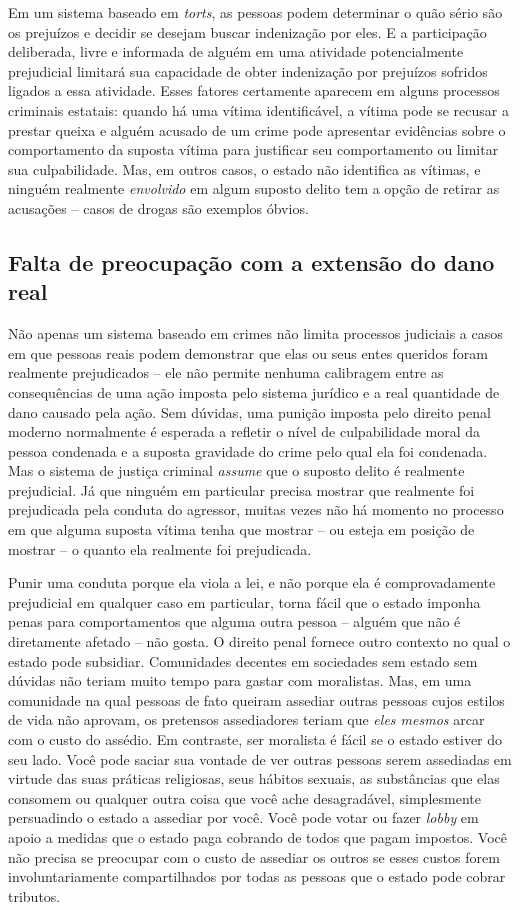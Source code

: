 Em um sistema baseado em \emph{torts}, as pessoas podem determinar o quão sério são os prejuízos e decidir se desejam buscar indenização por eles. E a participação deliberada, livre e informada de alguém em uma atividade potencialmente prejudicial limitará sua capacidade de obter indenização por prejuízos sofridos ligados a essa atividade. Esses fatores certamente aparecem em alguns processos criminais estatais: quando há uma vítima identificável, a vítima pode se recusar a prestar queixa e alguém acusado de um crime pode apresentar evidências sobre o comportamento da suposta vítima para justificar seu comportamento ou limitar sua culpabilidade. Mas, em outros casos, o estado não identifica as vítimas, e ninguém realmente \emph{envolvido} em algum suposto delito tem a opção de retirar as acusações -- casos de drogas são exemplos óbvios.

\subsection*{Falta de preocupação com a extensão do dano real}

Não apenas um sistema baseado em crimes não limita processos judiciais a casos em que pessoas reais podem demonstrar que elas ou seus entes queridos foram realmente prejudicados -- ele não permite nenhuma calibragem entre as consequências de uma ação imposta pelo sistema jurídico e a real quantidade de dano causado pela ação. Sem dúvidas, uma punição imposta pelo direito penal moderno normalmente é esperada a refletir o nível de culpabilidade moral da pessoa condenada e a suposta gravidade do crime pelo qual ela foi condenada. Mas o sistema de justiça criminal \emph{assume} que o suposto delito é realmente prejudicial. Já que ninguém em particular precisa mostrar que realmente foi prejudicada pela conduta do agressor, muitas vezes não há momento no processo em que alguma suposta vítima tenha que mostrar -- ou esteja em posição de mostrar -- o quanto ela realmente foi prejudicada. 

Punir uma conduta porque ela viola a lei, e não porque ela é comprovadamente prejudicial em qualquer caso em particular, torna fácil que o estado imponha penas para comportamentos que alguma outra pessoa -- alguém que não é diretamente afetado -- não gosta. O direito penal fornece outro contexto no qual o estado pode subsidiar. Comunidades decentes em sociedades sem estado sem dúvidas não teriam muito tempo para gastar com moralistas. Mas, em uma comunidade na qual pessoas de fato queiram assediar outras pessoas cujos estilos de vida não aprovam, os pretensos assediadores teriam que \emph{eles mesmos} arcar com o custo do assédio. Em contraste, ser moralista é fácil se o estado estiver do seu lado. Você pode saciar sua vontade de ver outras pessoas serem assediadas em virtude das suas práticas religiosas, seus hábitos sexuais, as substâncias que elas consomem ou qualquer outra coisa que você ache desagradável, simplesmente persuadindo o estado a assediar por você. Você pode votar ou fazer \emph{lobby} em apoio a medidas que o estado paga cobrando de todos que pagam impostos. Você não precisa se preocupar com o custo de assediar os outros se esses custos forem involuntariamente compartilhados por todas as pessoas que o estado pode cobrar tributos.

